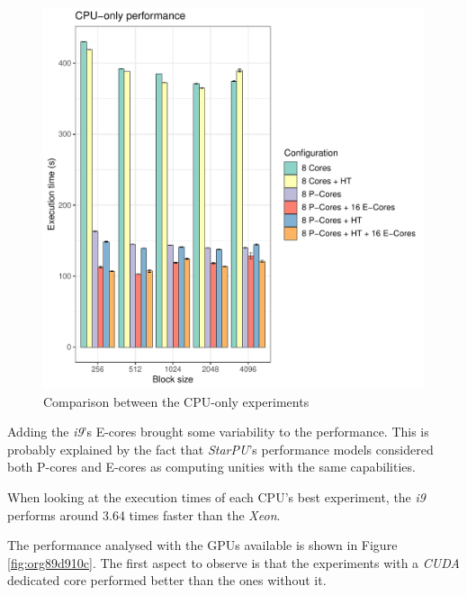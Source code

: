 \documentclass[ppgc,english]{iiufrgs}
\begin{document}
\begin{figure}[htbp]
\centering
\includegraphics[width=.9\linewidth]{./figures/cpu_only.pdf}
\caption{\label{fig:org8e3b083}Comparison between the CPU-only experiments}
\end{figure}

Adding the \emph{i9}'s E-cores brought some variability to the performance. This is probably explained by the fact that \emph{StarPU}'s performance models
considered both P-cores and E-cores as computing unities with the same capabilities.

When looking at the execution times of each CPU's best experiment, the \emph{i9} performs around 3.64 times faster than the \emph{Xeon}.

The performance analysed with the GPUs available is shown in Figure \ref{fig:org89d910c}. The first aspect to observe is that the experiments
with a \emph{CUDA} dedicated core performed better than the ones without it.
\end{document}
